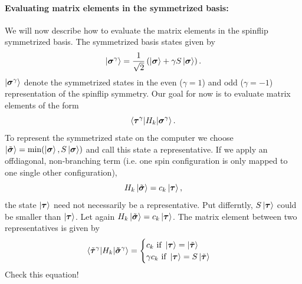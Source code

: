 \documentclass[]{article}
\theoremstyle{definition}
\begin{document}
\begin{enumerate}
  \paragraph{Evaluating matrix elements in the symmetrized basis:}
  We will now describe how to evaluate the matrix elements in the
  spinflip symmetrized basis. The symmetrized basis states given by
  $$ \ket{\bm{\sigma}^{\gamma}} = \frac{1}{\sqrt{2}}
  \left( \ket{\bm{\sigma}} + \gamma S\ket{\bm{\sigma}} \right). $$
  $\ket{\bm{\sigma}^{\gamma}}$ denote the symmetrized states in the even
  ($\gamma=1$) and odd ($\gamma=-1$) representation of the spinflip
  symmetry. Our goal for now is to evaluate matrix elements of the
  form
  $$\braket{\bm{\tau}^{\gamma}| H_k | \bm{\sigma}^{\gamma}}.$$
  To represent the symmetrized state on the computer we choose
  $\ket{\tilde{\bm{\sigma}}} = \min( \ket{\bm{\sigma}},
  S\ket{\bm{\sigma}})$ and call this state a representative.  If we
  apply an offdiagonal, non-branching term (i.e. one spin
  configuration is only mapped to one single other configuration),
  $$H_k\ket{\tilde{\bm{\sigma}}} = c_k\ket{\bm{\tau}},$$
  the state $\ket{\bm{\tau}}$ need not necessarily be a
  representative.  Put differntly, $S\ket{\bm{\tau}}$ could be smaller
  than $\ket{\bm{\tau}}$. Let again
  $H_k\ket{\tilde{\bm{\sigma}}} = c_k\ket{\bm{\tau}}$. The matrix
  element between two representatives is given by
  \[
    \braket{\tilde{\bm{\tau}}^{\gamma}| H_k | \bm{\tilde{\sigma}}^{\gamma}}=
    \begin{cases}
      c_k \text { if } \ket{\bm{\tau}} = \ket{\tilde{\bm{\tau}}} \\
      \gamma c_k \text { if } \ket{\bm{\tau}} = S\ket{\tilde{\bm{\tau}}}
    \end{cases}
  \]
  Check this equation!


\end{enumerate}
\end{document}
